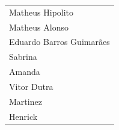 \begin{tabular}{l}
Matheus Hipolito\\
Matheus Alonso\\
Eduardo Barros Guimarães\\
Sabrina\\
Amanda\\
Vitor Dutra\\
Martinez\\
Henrick
\end{tabular}
